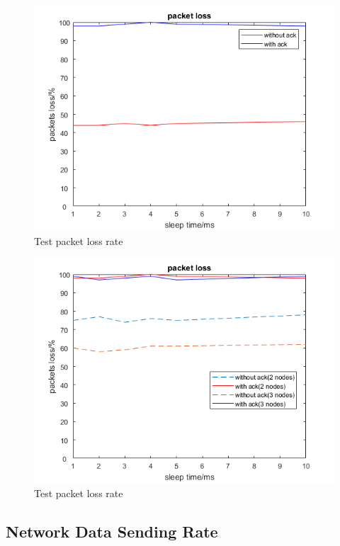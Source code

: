 \begin{figure}
    \centering
    \includegraphics{Figures/packetloss.png}
    \caption{Test packet loss rate}
    \label{fig:packetloss}
\end{figure}

\begin{figure}
    \centering
    \includegraphics{Figures/packetlossNEW.png}
    \caption{Test packet loss rate}
    \label{fig:packetlossnew}
\end{figure}

\subsection{Network Data Sending Rate}

